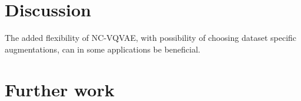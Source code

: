 \documentclass[../../thesis.tex]{subfiles}
\begin{document}




\section{Discussion}
The added flexibility of NC-VQVAE, with possibility of choosing dataset specific augmentations, can in some applications be beneficial.\newline


\section{Further work}
\end{document}
